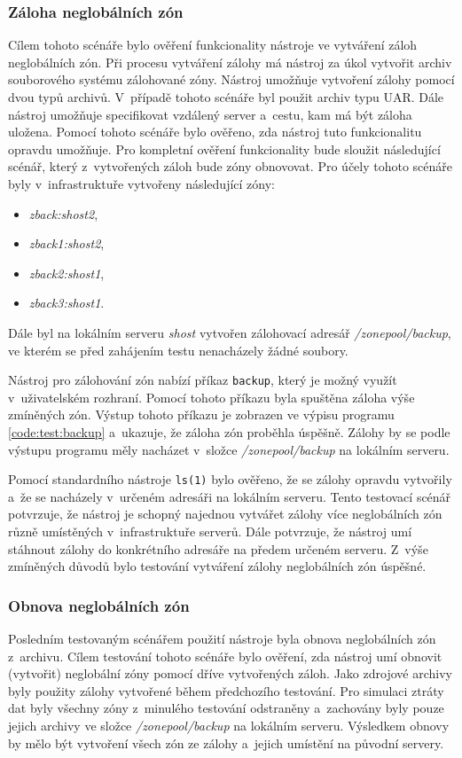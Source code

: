 \subsubsection{Záloha neglobálních zón}
\label{chapter:testing:scenario:backup_recovery:backup}
Cílem tohoto scénáře bylo ověření funkcionality nástroje ve vytváření záloh neglobálních zón. Při procesu vytváření zálohy má
nástroj za úkol vytvořit archiv souborového systému zálohované zóny. Nástroj umožňuje vytvoření zálohy pomocí dvou typů archivů.
V~případě tohoto scénáře byl použit archiv typu UAR. Dále nástroj umožňuje specifikovat vzdálený server a~cestu, kam má být
záloha uložena. Pomocí tohoto scénáře bylo ověřeno, zda nástroj tuto funkcionalitu opravdu umožňuje. Pro kompletní ověření
funkcionality bude sloužit následující scénář, který z~vytvořených záloh bude zóny obnovovat. Pro účely tohoto scénáře byly
v~infrastruktuře vytvořeny následující zóny:
\begin{itemize}
 \item \textit{zback:shost2},
 \item \textit{zback1:shost2},
 \item \textit{zback2:shost1},
 \item \textit{zback3:shost1}.
\end{itemize}
Dále byl na lokálním serveru \textit{shost} vytvořen zálohovací adresář \textit{/zonepool/backup}, ve kterém se před zahájením
testu nenacházely žádné soubory.

Nástroj pro zálohování zón nabízí příkaz \verb|backup|, který je možný využít v~uživatelském rozhraní. Pomocí tohoto příkazu byla
spuštěna záloha výše zmíněných zón. Výstup tohoto příkazu je zobrazen ve výpisu programu \ref{code:test:backup} a~ukazuje, že záloha
zón proběhla úspěšně. Zálohy by se podle výstupu programu měly nacházet v~složce \textit{/zonepool/backup} na lokálním serveru.

Pomocí standardního nástroje \verb|ls(1)| bylo ověřeno, že se zálohy opravdu vytvořily a~že se nacházely v~určeném adresáři na
lokálním serveru. Tento testovací scénář potvrzuje, že nástroj je schopný najednou vytvářet zálohy více neglobálních zón
různě umístěných v~infrastruktuře serverů. Dále potvrzuje, že nástroj umí stáhnout zálohy do konkrétního adresáře na předem
určeném serveru. Z~výše zmíněných důvodů bylo testování vytváření zálohy neglobálních zón úspěšné.
\subsubsection{Obnova neglobálních zón}
\label{chapter:testing:scenario:backup_recovery:recovery}
Posledním testovaným scénářem použití nástroje byla obnova neglobálních zón z~archivu. Cílem testování tohoto scénáře bylo 
ověření, zda nástroj umí obnovit (vytvořit) neglobální zóny pomocí dříve vytvořených záloh. Jako zdrojové archivy byly použity
zálohy vytvořené během předchozího testování. Pro simulaci ztráty dat byly všechny zóny z~minulého testování odstraněny
a~zachovány byly pouze jejich archivy ve složce \textit{/zonepool/backup} na lokálním serveru. Výsledkem obnovy by mělo být
vytvoření všech zón ze zálohy a~jejich umístění na původní servery. 

